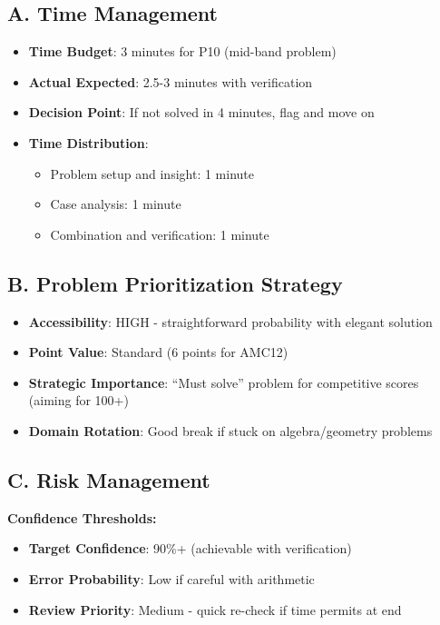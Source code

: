 \documentclass[]{article}
\begin{document}
\begin{competitionbox}
\subsection*{A. Time Management}
\begin{itemize}[leftmargin=*]
    \item \textbf{Time Budget}: 3 minutes for P10 (mid-band problem)
    \item \textbf{Actual Expected}: 2.5-3 minutes with verification
    \item \textbf{Decision Point}: If not solved in 4 minutes, flag and move on
    \item \textbf{Time Distribution}:
    \begin{itemize}
        \item Problem setup and insight: 1 minute
        \item Case analysis: 1 minute
        \item Combination and verification: 1 minute
    \end{itemize}
\end{itemize}

\subsection*{B. Problem Prioritization Strategy}
\begin{itemize}[leftmargin=*]
    \item \textbf{Accessibility}: HIGH - straightforward probability with elegant solution
    \item \textbf{Point Value}: Standard (6 points for AMC12)
    \item \textbf{Strategic Importance}: ``Must solve'' problem for competitive scores (aiming for 100+)
    \item \textbf{Domain Rotation}: Good break if stuck on algebra/geometry problems
\end{itemize}

\subsection*{C. Risk Management}
\textbf{Confidence Thresholds:}
\begin{itemize}[leftmargin=*]
    \item \textbf{Target Confidence}: 90\%+ (achievable with verification)
    \item \textbf{Error Probability}: Low if careful with arithmetic
    \item \textbf{Review Priority}: Medium - quick re-check if time permits at end
\end{itemize}


\end{competitionbox}
\end{document}

